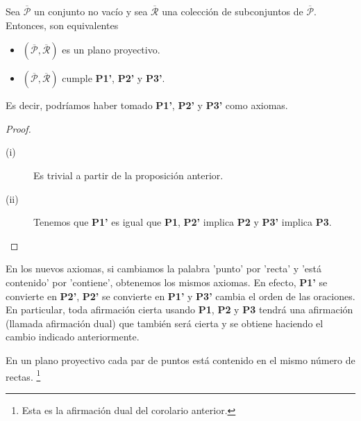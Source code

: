 \begin{theorem}
Sea $\displaystyle \overline{\mathcal{P}} $ un conjunto no vacío y sea $\displaystyle \overline{\mathcal{R}} $ una colección de subconjuntos de $\displaystyle \overline{\mathcal{P}} $. Entonces, son equivalentes
\begin{itemize}
\item $\displaystyle \left(\overline{\mathcal{P}}, \overline{\mathcal{R}}\right) $ es un plano proyectivo.
\item $\displaystyle \left(\overline{\mathcal{P}}, \overline{\mathcal{R}}\right) $ cumple \textbf{P1'}, \textbf{P2'} y \textbf{P3'}. 
\end{itemize}
Es decir, podríamos haber tomado \textbf{P1'}, \textbf{P2'} y \textbf{P3'} como axiomas.
\end{theorem}
\begin{proof}
\begin{description}
\item[(i)] Es trivial a partir de la proposición anterior.
\item[(ii)] Tenemos que \textbf{P1'} es igual que \textbf{P1}, \textbf{P2'} implica \textbf{P2} y \textbf{P3'} implica \textbf{P3}.
\end{description}
\end{proof}
\begin{observation}
En los nuevos axiomas, si cambiamos la palabra 'punto' por 'recta' y 'está contenido' por 'contiene', obtenemos los mismos axiomas. En efecto, \textbf{P1'} se convierte en \textbf{P2'}, \textbf{P2'} se convierte en \textbf{P1'} y \textbf{P3'} cambia el orden de las oraciones. \\ 
En particular, toda afirmación cierta usando \textbf{P1}, \textbf{P2} y \textbf{P3} tendrá una afirmación (llamada afirmación dual) que también será cierta y se obtiene haciendo el cambio indicado anteriormente.
\end{observation}
\begin{colorary}
En un plano proyectivo cada par de puntos está contenido en el mismo número de rectas. \footnote{Esta es la afirmación dual del corolario anterior.} 
\end{colorary}
